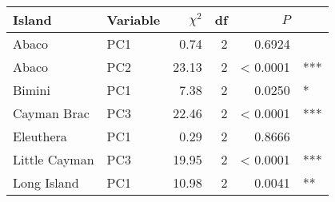 
\begin{tabular}{llrrrl}
\toprule
Island & Variable & $\chi^2$ & df & $P$ & \\
\midrule
Abaco & PC1 & 0.74 & 2 & 0.6924 & \\
Abaco & PC2 & 23.13 & 2 & < 0.0001 & ***\\
Bimini & PC1 & 7.38 & 2 & 0.0250 & *\\
Cayman Brac & PC3 & 22.46 & 2 & < 0.0001 & ***\\
Eleuthera & PC1 & 0.29 & 2 & 0.8666 & \\
Little Cayman & PC3 & 19.95 & 2 & < 0.0001 & ***\\
Long Island & PC1 & 10.98 & 2 & 0.0041 & **\\
\bottomrule
\end{tabular}